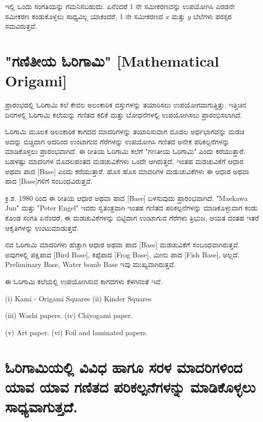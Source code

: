 \smallskip

ಇಲ್ಲಿ ಒಂದು ಸಂಗತಿಯನ್ನು ಗಮನಿಸಬಹುದು. ಏನೆಂದರೆ 1 ನೇ ಸಮೀಕರಣವನ್ನು ಉಪಯೋಗಿಸಿ ಎರಡನೇ ಸಮೀಕರಣ ಕಂಡುಕೊಳ್ಳಲು ಸಾಧ್ಯವಿಲ್ಲ ಯಾಕಂದರೆ, 1 ನೇ ಸಮೀಕರಣದ $x$ ಮತ್ತು $y$  ಬೆಲೆಗಳು ಪರಸ್ಪರ ಸಮವಿರುತ್ತವೆ. 


\section{"ಗಣಿತೀಯ ಓರಿಗಾಮಿ" [Mathematical Origami]}\label{sec1.4}%
ಪ್ರಾರಂಭದಲ್ಲಿ ಓರಿಗಾಮಿ ಕಲೆ ಕೇವಲ ಅಲಂಕಾರಿಕ ವಸ್ತುಗಳನ್ನು ತಯಾರಿಸಲು ಉಪಯೋಗವಾಗುತ್ತಿತ್ತು. ಇತ್ತಿಚಿನ ದಿನಗಳಲ್ಲಿ ಓರಿಗಾಮಿ ಕಲೆಯನ್ನು ಗಣಿತದ ಕಲಿಕೆ ಮತ್ತು ಬೋಧನೆಗಳಲ್ಲಿ ಉಪಯೋಗಿಸಲು ಪ್ರಾರಂಭಿಸಲಾಗಿದೆ. 

\smallskip

ಓರಿಗಾಮಿ ಮೂಲಕ ಅಲಂಕಾರಿಕ ಕಾಗದದ ಮಾದರಿಗಳನ್ನು ತಯಾರಿಸುವಾಗ ಮೊದಲ ಅರ್ಧಭಾಗವನ್ನು ಮಡಚಿ ಅದನ್ನು ಬಿಚ್ಚಿದಾಗ ಅದರಿಂದ ಉಂಟಾಗುವ ಗೆರೆಗಳನ್ನು ಉಪಯೋಗಿಸಿ ಗಣಿತದ ಅನೇಕ ಪರಿಕಲ್ಪನೆಗಳನ್ನು ಮಾಡಿಕೊಳ್ಳಲು ಪ್ರಾರಂಭವಾಗಿದೆ. ಈ ರೀತಿಯ ಓರಿಗಾಮಿ ಕಲೆಗೆ "ಗಣತೀಯ ಓರಿಗಾಮಿ" ಎಂದು ಕರೆಯುತ್ತಾರೆ. ಬಹಳಷ್ಟು ಮಾದರಿಗಳ ಮೊದಲಹಂತದ ಮಡಚುವಿಕೆಗಳು ಒಂದೇ ಆಗಿರುತ್ತದೆ. ಇಂತಹ ಮಡಚುವಿಕೆಗೆ ಆಧಾರ ಅಥವಾ ಪಾದ [Base] ಎಂದು ಕರೆಯುತ್ತಾರೆ. ಹೊಸ ಹೊಸ ಮಾದರಿಗಳ ಮಡುಚುವಿಕೆಗಳು ಈ ಆಧಾರ ಅಥವಾ ಪಾದ [Base]ಗಳಿಗೆ ಸಂಬಂಧವಿರುತ್ತವೆ.

\smallskip

ಕ್ರಿ.ಶ. 1980 ರಿಂದ ಈ ರೀತಿಯ ಆಧಾರ ಅಥವಾ ಪಾದ [Base] ಬಳಸುವುದು ಪ್ರಾರಂಭವಾಗಿದೆ. "Maekawa Jun" ಮತ್ತು "Peter Engel" ಇವರು ಸ್ವತಂತ್ರವಾಗಿ ಇಂತಹ ಗಣಿತದ ಪರಿಕಲ್ಪನೆಗಳನ್ನು ಮಾಡಿಕೊಳ್ಳುವಾಗ ಕಂಡು ಕೊಂಡ ಸಂಗತಿ ಏನೆಂದರೆ, ಈ ಮಡಚುವಿಕೆಗಳನ್ನು ಬಿಟ್ಟಿದಾಗ ಉಂಟಾಗುವ ಗೆರೆಗಳು ತ್ರಿಭುಜ, ಆಯತ ದಂತಹ ಇತರೆ ಆಕೃತಿಗಳನ್ನು ಉಂಟುಮಾಡುತ್ತವೆ. 
\smallskip

ನವ ಓರಿಗಾಮಿ ಮಾದರಿಗಳು ಹೆಚ್ಚಾಗಿ ಆಧಾರ ಅಥವಾ ಪಾದ [Base] ಮಡಚುವಿಕೆಗೆ ಸಂಬಂಧವಾಗಿರುತ್ತವೆ. ಅವುಗಳಲ್ಲಿ ಪಕ್ಷಿಪಾದ [Bird Base], ಕಪ್ಪೆಪಾದ [Frog Base], ಮೀನು ಪಾದ [Fish Base], ಅಲ್ಲದೆ. Preliminary Base, Water bomb Base ಇವು ಮುಖ್ಯವಾಗಿರುತ್ತವೆ. 

\smallskip
ಈ ಓರಿಗಾಮಿ ಕಲೆಯಲ್ಲಿ ಉಪಯೋಗಿಸುವ ಕಾಗದಗಳು ಕೆಳಗಿನಂತೆ ಇವೆ. 

\smallskip

(i) Kami - Origami Squares (ii) Kinder Squares

\smallskip
 (iii) Washi papers. (iv) Chiyogami paper. 
 
 \smallskip
 (v) Art paper. (vi) Foil and laminated papers.


\section{ಓರಿಗಾಮಿಯಲ್ಲಿ ವಿವಿಧ ಹಾಗೂ ಸರಳ ಮಾದರಿಗಳಿಂದ ಯಾವ ಯಾವ ಗಣಿತದ ಪರಿಕಲ್ಪನೆಗಳನ್ನು ಮಾಡಿಕೊಳ್ಳಲು ಸಾಧ್ಯವಾಗುತ್ತದೆ. }\label{sec1.5}%

